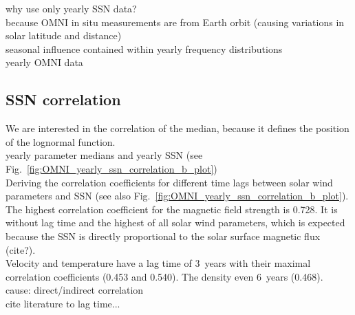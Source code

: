why use only yearly SSN data?\\
because OMNI in situ measurements are from Earth orbit (causing variations in solar latitude and distance)\\
seasonal influence contained within yearly frequency distributions\\
yearly OMNI data\\

\subsection{SSN correlation}
We are interested in the correlation of the median, because it defines the position of the lognormal function.\\
yearly parameter medians and yearly SSN (see Fig.~\ref{fig:OMNI_yearly_ssn_correlation_b_plot})\\

Deriving the correlation coefficients for different time lags between solar wind parameters and SSN (see also Fig.~\ref{fig:OMNI_yearly_ssn_correlation_b_plot}).\\

The highest correlation coefficient for the magnetic field strength is 0.728. It is without lag time and the highest of all solar wind parameters, which is expected because the SSN is directly proportional to the solar surface magnetic flux (cite?).\\
Velocity and temperature have a lag time of 3~years with their maximal correlation coefficients (0.453 and 0.540). The density even 6~years (0.468).\\

cause: direct/indirect correlation\\
cite literature to lag time...\\

